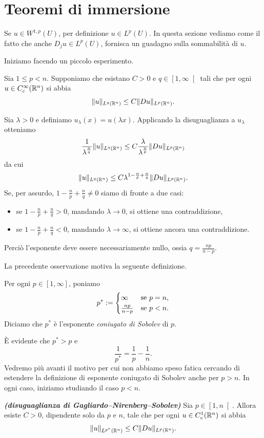 \section{Teoremi di immersione}
Se $u \in W^{1,p}(U)$, per definizione $u \in L^p(U)$. In questa sezione vediamo come il fatto che anche $D_ju \in L^p(U)$, fornisca un guadagno sulla sommabilità di $u$.

Iniziamo facendo un piccolo esperimento.
\begin{osservazione}
	Sia $1 \le p < n$. Supponiamo che esistano $C > 0$ e $q \in \left[ 1,\infty \right[ $ tali che per ogni $u \in C^\infty_c(\mathbb{R}^n)$ si abbia
	\[ \lVert u\rVert_{L^q(\mathbb{R}^n)} \le C \lVert Du\rVert_{L^p(\mathbb{R}^n)}. \]
	
	Sia $\lambda > 0$ e definiamo $u_\lambda(x) = u(\lambda x)$. Applicando la disuguaglianza a $u_\lambda$ otteniamo 
	\[ \frac{1}{\lambda^{\frac{n}{q}}}\lVert u\rVert_{L^q(\mathbb{R}^n)} \le C \frac{\lambda}{\lambda^{\frac{n}{p}}}\lVert Du\rVert_{L^p(\mathbb{R}^n)} \]
	da cui
	\[\lVert u\rVert_{L^q(\mathbb{R}^n)} \le C \lambda^{1-\frac{n}{p}+\frac{n}{q}}\lVert Du\rVert_{L^p(\mathbb{R}^n)}.  \]
	Se, per assurdo, $1-\frac{n}{p}+\frac{n}{q} \ne 0$ siamo di fronte a due casi:
	\begin{itemize}
		\item se $1-\frac{n}{p}+\frac{n}{q} > 0$, mandando $\lambda \to 0$, si ottiene una contraddizione,
		\item se $1-\frac{n}{p}+\frac{n}{q} < 0$, mandando $\lambda \to \infty$, si ottiene ancora una contraddizione.
	\end{itemize} 
	Perciò l'esponente deve essere necessariamente nullo, ossia $q = \frac{np}{n-p}$.
\end{osservazione}
La precedente osservazione motiva la seguente definizione.
\begin{definizione}
	Per ogni $p \in \left[ 1,\infty\right] $, poniamo 
	\[ p^* := \begin{cases}
		\infty & \textup{se }p=n, \\
		\frac{np}{n-p} & \textup{se } p < n.
	\end{cases} \]
	Diciamo che $p^*$ è l'esponente \emph{coniugato di Sobolev} di $p$.
\end{definizione}
È evidente che $p^* > p$ e 
\[ \frac{1}{p^*} = \frac{1}{p} - \frac{1}{n}. \]
Vedremo più avanti il motivo per cui non abbiamo speso fatica cercando di estendere la definizione di esponente coniugato di Sobolev anche per $p>n$. In ogni caso, iniziamo studiando il caso $p < n$.
\begin{teorema}\emph{\textbf{(disuguaglianza di Gagliardo--Nirenberg--Sobolev)}}\label{GNS}
	Sia $p \in \left[ 1, n\right[ $. Allora esiste $C > 0$, dipendente solo da $p$ e $n$, tale che per ogni $u \in C^1_c(\mathbb{R}^n)$ si abbia
	\[  \lVert u\rVert_{L^{p^*}(\mathbb{R}^n)}\le C \lVert Du\rVert_{L^p(\mathbb{R}^n)}. \]
\end{teorema}
